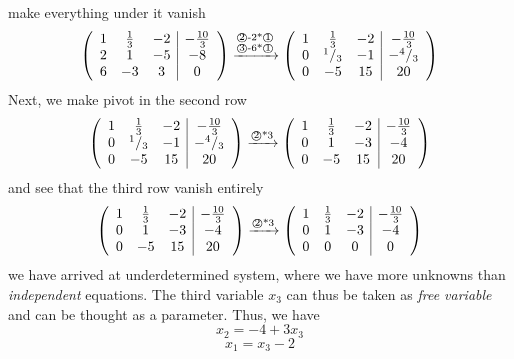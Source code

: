 \documentclass[8pt]{article} %
\begin{document}
\begin{enumerate}
{\[		\]
		make everything under it vanish
		\[\left(\begin{array}{ccc|c}1&\frac{1}{3}&-2&-\frac{10}{3}\\2&1&-5&-8\\6&-3&3&0\end{array}\right)\xrightarrow{\begin{subarray}{c}\text{\textcircled{2}-2*\textcircled{1}}\\\text{\textcircled{3}-6*\textcircled{1}}\end{subarray}}\left(\begin{array}{ccc|c}1&\frac{1}{3}&-2&-\frac{10}{3}\\0&^1/_3&-1&-^4/_3
			\\0&-5&15&20\end{array}\right)
		\]
		Next, we make pivot in the second row
		\[\left(\begin{array}{ccc|c}1&\frac{1}{3}&-2&-\frac{10}{3}\\0&^1/_3&-1&-^4/_3
			\\0&-5&15&20\end{array}\right)\xrightarrow{\text{\textcircled{2}*3}}\left(\begin{array}{ccc|c}1&\frac{1}{3}&-2&-\frac{10}{3}\\0&1&-3&-4\\0&-5&15&20\end{array}\right)
		\]
		and see that the third row vanish entirely
		\[\left(\begin{array}{ccc|c}1&\frac{1}{3}&-2&-\frac{10}{3}\\0&1&-3&-4\\0&-5&15&20\end{array}\right)\xrightarrow{\text{\textcircled{2}*3}}\left(\begin{array}{ccc|c}1&\frac{1}{3}&-2&-\frac{10}{3}\\0&1&-3&-4\\0&0&0&0\end{array}\right)
		\]
		we have arrived at underdetermined system, where we have more unknowns than {\it independent} equations.
		The third variable $x_3$ can thus be taken as {\it free variable} and can be thought as a parameter. Thus, we have
		\[x_2=-4+3x_3\]\[x_1=x_3-2\]
		}
\end{enumerate}
\end{document}
